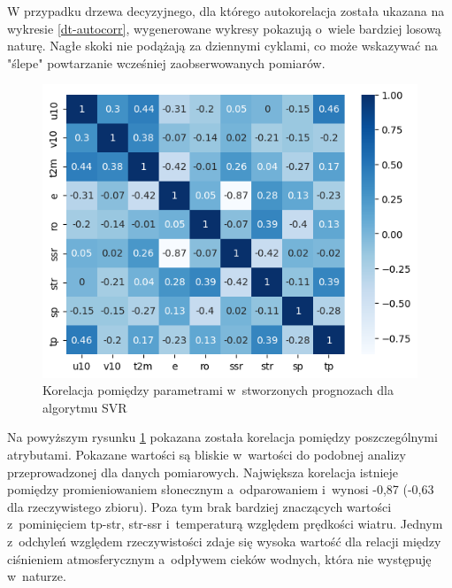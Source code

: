 W przypadku drzewa decyzyjnego, dla którego autokorelacja została ukazana na wykresie \ref{dt-autocorr},
wygenerowane wykresy pokazują o~wiele bardziej losową naturę. Nagłe skoki nie podążają za dziennymi cyklami,
co może wskazywać na "ślepe" powtarzanie wcześniej zaobserwowanych pomiarów. 

\begin{figure}[H]
    \centering
    \includegraphics[width=\textwidth]{images/svr_corr_matrix.png}
    \caption{Korelacja pomiędzy parametrami w~stworzonych prognozach dla algorytmu SVR}
    \label{svr-corr-matrix}
\end{figure}

Na powyższym rysunku \ref{svr-corr-matrix} pokazana została korelacja pomiędzy poszczególnymi atrybutami.
Pokazane wartości są bliskie w~wartości do podobnej analizy przeprowadzonej dla danych pomiarowych. 
Największa korelacja istnieje pomiędzy promieniowaniem słonecznym a~odparowaniem i~wynosi -0,87 (-0,63 dla
rzeczywistego zbioru). Poza tym brak bardziej znaczących wartości z~pominięciem tp-str, str-ssr i~temperaturą
względem prędkości wiatru. Jednym z~odchyleń względem rzeczywistości zdaje się wysoka wartość dla 
relacji między ciśnieniem atmosferycznym a~odpływem cieków wodnych, która nie występuję w~naturze.

